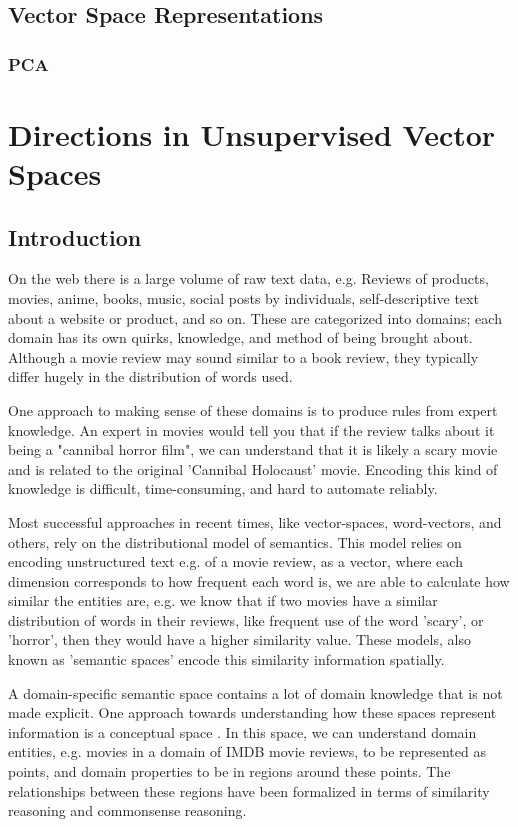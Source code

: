 \documentclass{article}
\begin{document}
\subsection{Vector Space Representations}\label{VectorSpaceRepresentations}
\subsubsection{PCA}\label{PCA}
\section{Directions in Unsupervised Vector Spaces}
\subsection{Introduction}
On the web there is a large volume of raw text data, e.g. Reviews of products, movies, anime, books, music, social posts by individuals, self-descriptive text about a website or product, and so on. These are categorized into domains; each domain has its own quirks, knowledge, and method of being brought about. Although a movie review may sound similar to a book review, they typically differ hugely in the distribution of words used.

One approach to making sense of these domains is to produce rules from expert knowledge. An expert in movies would tell you that if the review talks about it being a "cannibal horror film", we can understand that it is likely a scary movie and is related to the original 'Cannibal Holocaust' movie. Encoding this kind of knowledge is difficult, time-consuming, and hard to automate reliably.

Most successful approaches in recent times, like vector-spaces, word-vectors, and others, rely on the distributional model of semantics. This model relies on encoding unstructured text e.g. of a movie review, as a vector, where each dimension corresponds to how frequent each word is, we are able to calculate how similar the entities are, e.g. we know that if two movies have a similar distribution of words in their reviews, like frequent use of the word 'scary', or 'horror', then they would have a higher similarity value. These models, also known as 'semantic spaces' encode this similarity information spatially.

A domain-specific semantic space contains a lot of domain knowledge that is not made explicit. One approach towards understanding how these spaces represent information is a conceptual space \cite{Gardenfors2014}. In this space, we can understand domain entities, e.g. movies in a domain of IMDB movie reviews, to be represented as points, and domain properties to be in regions around these points. The relationships between these regions have been formalized in terms of  similarity reasoning and commonsense reasoning.
\end{document}
